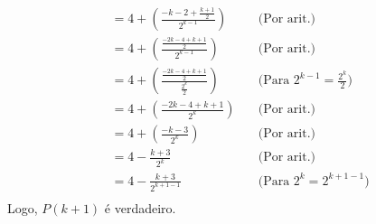 \begin{enumerate}
\begin{align*}
		&= 4 + (\frac{-k - 2 + \frac{k + 1}{2}}{2^{k - 1}}) &\quad \text{(Por arit.)} \\
		&= 4 + (\frac{\frac{-2k - 4 + k + 1}{2}}{2^{k - 1}}) &\quad \text{(Por arit.)} \\
		&= 4 + (\frac{\frac{-2k - 4 + k + 1}{2}}{\frac{2^k}{2}}) &\quad \text{(Para $2^{k - 1} = \frac{2^k}{2}$)} \\
		&= 4 + (\frac{-2k - 4 + k + 1}{2^k}) &\quad \text{(Por arit.)} \\
		&= 4 + (\frac{-k - 3}{2^k}) &\quad \text{(Por arit.)} \\
		&= 4 - \frac{k + 3}{2^k} &\quad \text{(Por arit.)} \\
		&= 4 - \frac{k + 3}{2^{k + 1 - 1}} &\quad \text{(Para $2^k = 2^{k + 1 - 1}$)} \\
	\end{align*}
	Logo, $P(k + 1)$ é verdadeiro.
\end{enumerate}

